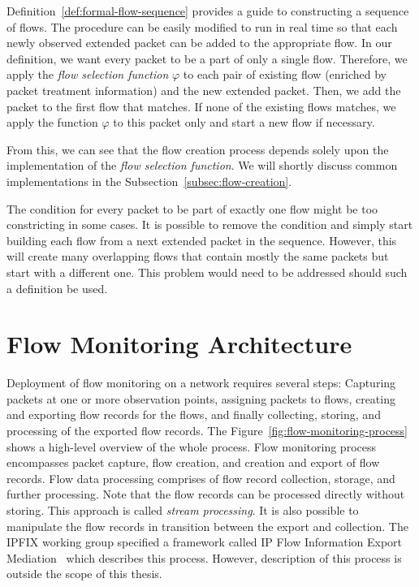 Definition~\ref{def:formal-flow-sequence} provides a guide to constructing a sequence of flows. The procedure can be easily modified to run in real time so that each newly observed extended packet can be added to the appropriate flow. In our definition, we want every packet to be a part of only a single flow. Therefore, we apply the \emph{flow selection function} $\varphi$ to each pair of existing flow (enriched by packet treatment information) and the new extended packet. Then, we add the packet to the first flow that matches. If none of the existing flows matches, we apply the function $\varphi$ to this packet only and start a new flow if necessary. 

From this, we can see that the flow creation process depends solely upon the implementation of the \emph{flow selection function}. We will shortly discuss common implementations in the Subsection~\ref{subsec:flow-creation}.

The condition for every packet to be part of exactly one flow might be too constricting in some cases. It is possible to remove the condition and simply start building each flow from a next extended packet in the sequence. However, this will create many overlapping flows that contain mostly the same packets but start with a different one. This problem would need to be addressed should such a definition be used.

\section{Flow Monitoring Architecture}\label{sec:flow-monitoring-architecture}

Deployment of flow monitoring on a network requires several steps: Capturing packets at one or more observation points, assigning packets to flows, creating and exporting flow records for the flows, and finally collecting, storing, and processing of the exported flow records. 
The Figure~\ref{fig:flow-monitoring-process} shows a high-level overview of the whole process. Flow monitoring process encompasses packet capture, flow creation, and creation and export of flow records. Flow data processing comprises of flow record collection, storage, and further processing. Note that the flow records can be processed directly without storing. This approach is called \emph{stream processing}. It is also possible to manipulate the flow records in transition between the export and collection. The IPFIX working group specified a framework called IP Flow Information Export Mediation~\cite{rfc6183} which describes this process. However, description of this process is outside the scope of this thesis.

